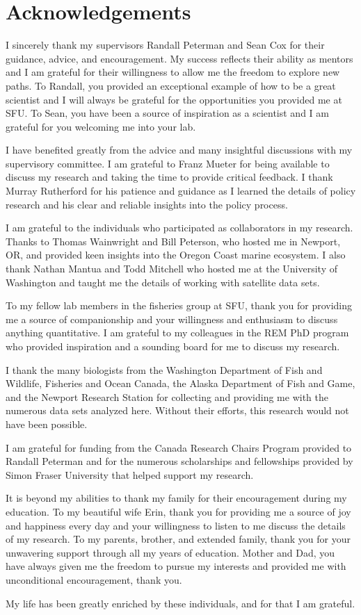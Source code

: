 

\chapter*{Acknowledgements}

I sincerely thank my supervisors Randall Peterman and Sean Cox for their
guidance, advice, and encouragement. My success reflects their ability as
mentors and I am grateful for their willingness to allow me the freedom to
explore new paths. To Randall, you provided an exceptional example of how to be
a great scientist and I will always be grateful for the opportunities you
provided me at SFU. To Sean, you have been a source of inspiration as a
scientist and I am grateful for you welcoming me into your lab.

I have benefited greatly from the advice and many insightful discussions with my
supervisory committee. I am grateful to Franz Mueter for being available to
discuss my research and taking the time to provide critical feedback. I thank
Murray Rutherford for his patience and guidance as I learned the details of
policy research and his clear and reliable insights into the policy process.

I am grateful to the individuals who participated as collaborators in my
research. Thanks to Thomas Wainwright and Bill Peterson, who hosted me in
Newport, OR, and provided keen insights into the Oregon Coast marine ecosystem.
I also thank Nathan Mantua and Todd Mitchell who hosted me at the University of
Washington and taught me the details of working with satellite data sets.

To my fellow lab members in the fisheries group at SFU, thank you for providing
me a source of companionship and your willingness and enthusiasm to discuss
anything quantitative. I am grateful to my colleagues in the REM PhD program who
provided inspiration and a sounding board for me to discuss my research.

I thank the many biologists from the Washington Department of Fish and Wildlife,
Fisheries and Ocean Canada, the Alaska Department of Fish and Game, and the
Newport Research Station for collecting and providing me with the numerous data
sets analyzed here. Without their efforts, this research would not have been
possible.

I am grateful for funding from the Canada Research Chairs Program provided to
Randall Peterman and for the numerous scholarships and fellowships provided by
Simon Fraser University that helped support my research.

It is beyond my abilities to thank my family for their encouragement during my
education. To my beautiful wife Erin, thank you for providing me a source of joy
and happiness every day and your willingness to listen to me discuss the details
of my research. To my parents, brother, and extended family, thank you for your
unwavering support through all my years of education. Mother and Dad, you have
always given me the freedom to pursue my interests and provided me with
unconditional encouragement, thank you.

My life has been greatly enriched by these individuals, and for that I am
grateful.

